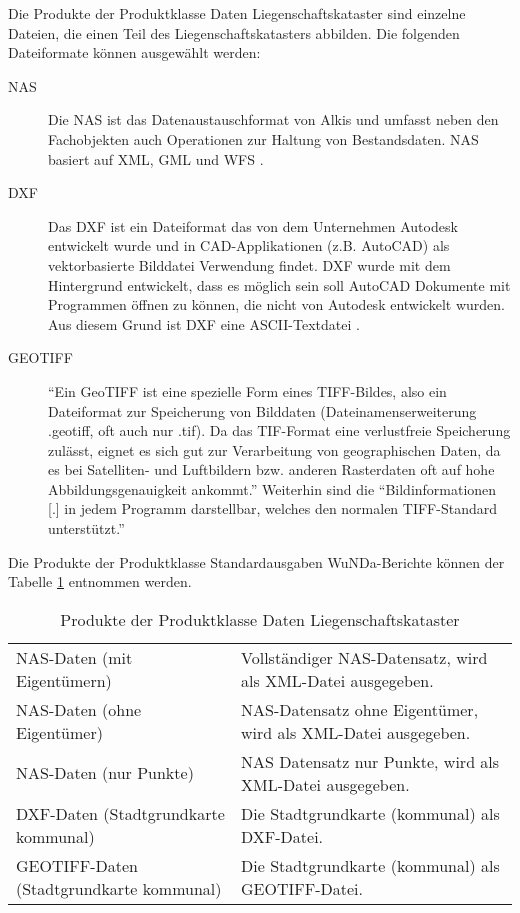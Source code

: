 Die Produkte der Produktklasse Daten Liegenschaftskataster sind einzelne Dateien, die einen Teil des Liegenschaftskatasters abbilden. Die folgenden Dateiformate können ausgewählt werden:
\begin{description}
\item[NAS] Die \ac{NAS} ist das Datenaustauschformat von Alkis und umfasst neben den Fachobjekten auch Operationen zur Haltung von Bestandsdaten. \ac{NAS} basiert auf \ac{XML}, \ac{GML} und \ac{WFS} \autocite[vgl.][]{sachsen-nas}.

\item[DXF] Das \ac{DXF} ist ein Dateiformat das von dem Unternehmen Autodesk entwickelt wurde und in \ac{CAD}-Applikationen (z.B. AutoCAD) als vektorbasierte Bilddatei Verwendung findet.
\ac{DXF} wurde mit dem Hintergrund entwickelt, dass es möglich sein soll AutoCAD Dokumente mit Programmen öffnen zu können, die nicht von Autodesk entwickelt wurden. Aus diesem Grund ist \ac{DXF} eine ASCII-Textdatei \autocite[vgl.][]{fileinfo-dxf}.

\item[GEOTIFF] "`Ein GeoTIFF ist eine spezielle Form eines TIFF-Bildes, also ein Dateiformat zur Speicherung von Bilddaten (Dateinamenserweiterung .geotiff, oft auch nur .tif). Da das TIF-Format eine verlustfreie Speicherung zulässt, eignet es sich gut zur Verarbeitung von geographischen Daten, da es bei Satelliten- und Luftbildern bzw. anderen Rasterdaten oft auf hohe Abbildungsgenauigkeit ankommt."' \autocite{wiki-geotiff} Weiterhin sind die "`Bildinformationen [.] in jedem Programm darstellbar, welches den normalen TIFF-Standard unterstützt."' \autocite{wiki-geotiff}
\end{description}

Die Produkte der Produktklasse Standardausgaben WuNDa-Berichte können der Tabelle \ref{tab-daten-kataster} entnommen werden.
\begin{longtable}{|p{}|p{}|}
	\caption{Produkte der Produktklasse Daten Liegenschaftskataster} \label{tab-daten-kataster} \\
	\hline 
	\head{Produktname}  & \head{Beschreibung} \tabularnewline
	\hline 
	\endhead	
				
	\acs{NAS}-Daten (mit Eigentümern)
	&
	Vollständiger \acs{NAS}-Datensatz, wird als \acs{XML}-Datei ausgegeben. \\
	\hline
	\acs{NAS}-Daten (ohne Eigentümer)
	&
	\acs{NAS}-Datensatz ohne Eigentümer, wird als \acs{XML}-Datei ausgegeben. \\
	\hline
	\acs{NAS}-Daten (nur Punkte)
	&
	\acs{NAS} Datensatz nur Punkte, wird als \acs{XML}-Datei ausgegeben. \\
	\hline
	\acs{DXF}-Daten (Stadtgrundkarte kommunal)
	&
	Die Stadtgrundkarte (kommunal) als \acs{DXF}-Datei.  \\
	\hline
	GEOTIFF-Daten (Stadtgrundkarte kommunal)
	&
	Die Stadtgrundkarte (kommunal) als GEOTIFF-Datei. \\
	\hline	
\end{longtable} 

